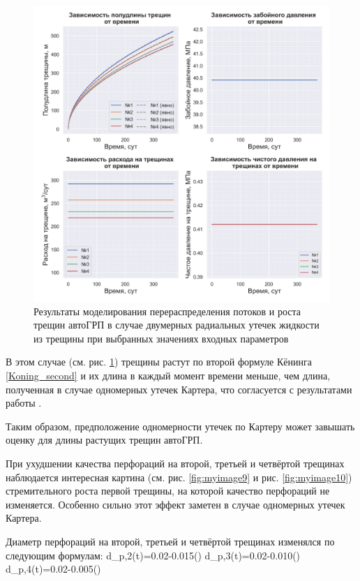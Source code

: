 \begin{figure}[H] 
\center
\includegraphics[width=.95\linewidth]{images/myimage2.jpg}
\caption{Результаты моделирования перераспределения потоков и роста трещин автоГРП в случае двумерных радиальных утечек жидкости из трещины при выбранных значениях входных параметров} 
\label{fig:myimage2}
\end{figure}

В этом случае (см. рис. \ref{fig:myimage2}) трещины растут по второй формуле Кёнинга \eqref{Koning_second} и их длина в каждый момент времени меньше, чем длина, полученная в случае одномерных утечек Картера, что согласуется с результатами работы \cite{hagoort}.

Таким образом, предположение одномерности утечек по Картеру \cite{karter_book} может завышать оценку для длины растущих трещин автоГРП.

При ухудшении качества перфораций на второй, третьей и четвёртой трещинах наблюдается интересная картина (см. рис. \ref{fig:myimage9} и рис. \ref{fig:myimage10}) стремительного роста первой трещины, на которой качество перфораций не изменяется.
Особенно сильно этот эффект заметен в случае одномерных утечек Картера.

Диаметр перфораций на второй, третьей и четвёртой трещинах изменялся по следующим формулам:
\beq
d_{p,2}(t)=0.02-0.015\cdot\left(\right)
\eeq
\beq
d_{p,3}(t)=0.02-0.010\cdot\left(\right)
\eeq
\beq
d_{p,4}(t)=0.02-0.005\cdot\left(\right)
\eeq

